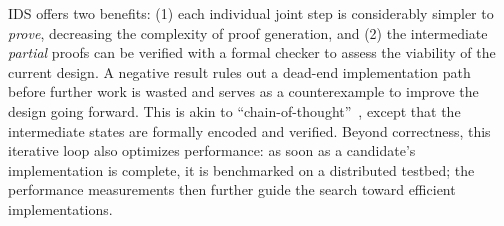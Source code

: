 IDS offers two benefits: (1) each individual joint step is considerably simpler to \textit{prove}, decreasing the complexity of proof generation, and (2) the intermediate \textit{partial} proofs can be verified with a formal checker to assess the viability of the current design. A negative result rules out a dead-end implementation path before further work is wasted and serves as a counterexample to improve the design going forward.
This is akin to ``chain-of-thought''~\cite{chain-of-thought},
except that the intermediate states are formally encoded and verified. %
Beyond correctness, this iterative loop also optimizes performance: as soon as a candidate's implementation is complete, it is benchmarked on a distributed testbed; the performance measurements then further guide the search toward efficient implementations.


